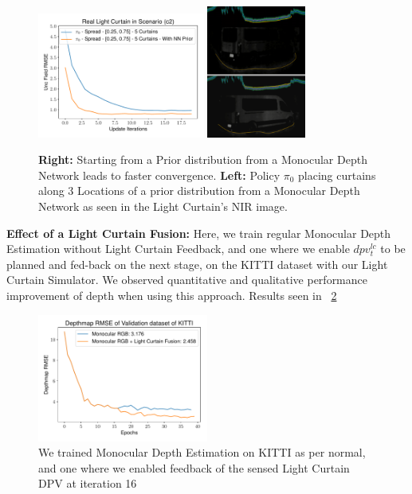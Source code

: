 \begin{figure}[h]
   \centering
   \begin{minipage}{0.5\textwidth}
       \centering
       \includegraphics[width=0.49\textwidth]{figures/figure_X.pdf}
       \includegraphics[width=0.29\textwidth]{figures/placement3.png}
   \end{minipage}\hfill
   \centering
   \caption{ \textbf{Right:} Starting from a Prior distribution from a Monocular Depth Network leads to faster convergence. \textbf{Left:} Policy $\pi_{0}$ placing curtains along 3 Locations of a prior distribution from a Monocular Depth Network as seen in the Light Curtain's NIR image.}
   \label{fig:prior} 
\end{figure}

\textbf{Effect of a Light Curtain Fusion:} Here, we train regular Monocular Depth Estimation without Light Curtain Feedback, and one where we enable $dpv_{t}^{lc}$ to be planned and fed-back on the next stage, on the KITTI dataset with our Light Curtain Simulator. We observed quantitative and qualitative performance improvement of depth when using this approach. Results seen in ~\ref{fig:lfusion} 

\begin{figure}[h]
   \centering
   \begin{minipage}{0.5\textwidth}
       \centering
       \includegraphics[width=0.5\textwidth]{figures/Figure_10.pdf}
   \end{minipage}\hfill
   \centering
   \caption{We trained Monocular Depth Estimation on KITTI as per normal, and one where we enabled feedback of the sensed Light Curtain DPV at iteration 16}
   \label{fig:lfusion} 
\end{figure}

